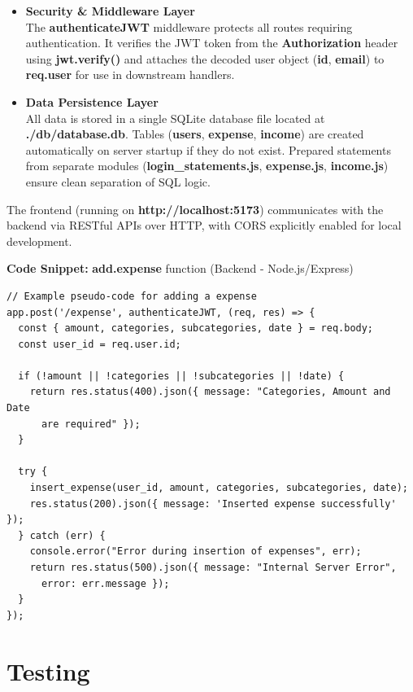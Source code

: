 \documentclass[12pt]{report}
\begin{document}
\begin{itemize}
    \item \textbf{Security \& Middleware Layer} \\
    The \textbf{authenticateJWT} middleware protects all routes requiring authentication. It verifies the JWT token from the \textbf{Authorization} header using \textbf{jwt.verify()} and attaches the decoded user object (\textbf{id}, \textbf{email}) to \textbf{req.user} for use in downstream handlers.

    \item \textbf{Data Persistence Layer} \\
    All data is stored in a single SQLite database file located at \textbf{./db/database.db}. Tables (\textbf{users}, \textbf{expense}, \textbf{income}) are created automatically on server startup if they do not exist. Prepared statements from separate modules (\textbf{login\_statements.js}, \textbf{expense.js}, \textbf{income.js}) ensure clean separation of SQL logic.
\end{itemize}

\noindent
The frontend (running on \textbf{http://localhost:5173}) communicates with the backend via RESTful APIs over HTTP, with CORS explicitly enabled for local development.

\newpage
\noindent
\textbf{Code Snippet:} \textbf{add.expense} function (Backend - Node.js/Express)
\begin{verbatim}
// Example pseudo-code for adding a expense
app.post('/expense', authenticateJWT, (req, res) => {
  const { amount, categories, subcategories, date } = req.body;
  const user_id = req.user.id;

  if (!amount || !categories || !subcategories || !date) {
    return res.status(400).json({ message: "Categories, Amount and Date
      are required" });
  }

  try {
    insert_expense(user_id, amount, categories, subcategories, date);
    res.status(200).json({ message: 'Inserted expense successfully' });
  } catch (err) {
    console.error("Error during insertion of expenses", err);
    return res.status(500).json({ message: "Internal Server Error",
      error: err.message });
  }
});

\end{verbatim}

\newpage
\section{Testing}
\end{document}
